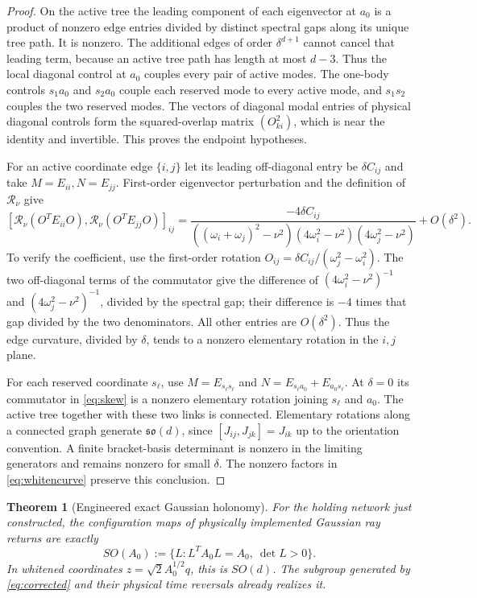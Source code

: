 \documentclass[11pt]{article}
\numberwithin{equation}{section}
\newtheorem{theorem}{Theorem}[section]
\theoremstyle{definition}
\begin{document}
\begin{proof}
On the active tree the leading component of each eigenvector
at $a_0$ is a product of nonzero edge entries divided by distinct
spectral gaps along its unique tree path. It is nonzero.
The additional edges of order $\delta^{d+1}$ cannot cancel that
leading term, because an active tree path has length at most $d-3$.
Thus the local diagonal control at $a_0$ couples every pair of
active modes. The one-body controls $s_1a_0$ and $s_2a_0$ couple
each reserved mode to every active mode, and $s_1s_2$ couples
the two reserved modes. The vectors of diagonal modal entries
of physical diagonal controls form the squared-overlap matrix
$(O_{ki}^2)$, which is near the identity and invertible.
This proves the endpoint hypotheses.

For an active coordinate edge $\{i,j\}$ let its leading off-diagonal
entry be $\delta C_{ij}$ and take $M=E_{ii},N=E_{jj}$.
First-order eigenvector perturbation and the definition of
$\mathcal R_\nu$ give
\begin{equation}\label{eq:edgecurvature}
 [\mathcal R_\nu(O^TE_{ii}O),\mathcal R_\nu(O^TE_{jj}O)]_{ij}
 =
 \frac{-4\delta C_{ij}}
 {((\omega_i+\omega_j)^2-\nu^2)
  (4\omega_i^2-\nu^2)(4\omega_j^2-\nu^2)}
 +O(\delta^2).
\end{equation}
To verify the coefficient, use the first-order rotation
$O_{ij}=\delta C_{ij}/(\omega_j^2-\omega_i^2)$.
The two off-diagonal terms of the commutator give the difference
of $(4\omega_i^2-\nu^2)^{-1}$ and
$(4\omega_j^2-\nu^2)^{-1}$, divided by the spectral gap;
their difference is $-4$ times that gap divided by the two
denominators. All other entries are $O(\delta^2)$.
Thus the edge curvature, divided by $\delta$, tends to a nonzero
elementary rotation in the $i,j$ plane.

For each reserved coordinate $s_\ell$, use
$M=E_{s_\ell s_\ell}$ and
$N=E_{s_\ell a_0}+E_{a_0s_\ell}$.
At $\delta=0$ its commutator in \eqref{eq:skew} is a nonzero
elementary rotation joining $s_\ell$ and $a_0$.
The active tree together with these two links is connected.
Elementary rotations along a connected graph generate
$\mathfrak{so}(d)$, since $[J_{ij},J_{jk}]=J_{ik}$
up to the orientation convention.
A finite bracket-basis determinant is nonzero in the limiting
generators and remains nonzero for small $\delta$.
The nonzero factors in \eqref{eq:whitencurve} preserve this conclusion.
\end{proof}

\begin{theorem}[Engineered exact Gaussian holonomy]\label{thm:gaussian}
For the holding network just constructed, the configuration maps
of physically implemented Gaussian ray returns are exactly
\[
 SO(A_0):=\{L:L^TA_0L=A_0,\ \det L>0\}.
\]
In whitened coordinates $z=\sqrt2 A_0^{1/2}q$, this is $SO(d)$.
The subgroup generated by \eqref{eq:corrected} and their physical
time reversals already realizes it.
\end{theorem}
\end{document}
